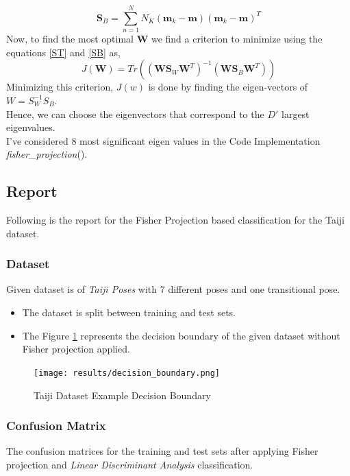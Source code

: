 \documentclass[12pt,twoside,a4paper]{article}
\begin{document}
\begin{equation} \label{SB}
    \textbf{S}_B = \sum_{n=1}^N N_K(\textbf{m}_k - \textbf{m})(\textbf{m}_k - \textbf{m})^T
\end{equation}
Now, to find the most optimal \textbf{W} we find a criterion to minimize using the equations \eqref{ST} and \eqref{SB} as,
\begin{equation}
    J(\textbf{W}) = Tr\left( (\textbf{W}\textbf{S}_W\textbf{W}^T)^{-1} (\textbf{W}\textbf{S}_B\textbf{W}^T) \right )
\end{equation}
Minimizing this criterion, $J(w)$ is done by finding the eigen-vectors of $W = S_W^{-1}S_B$. \\
Hence, we can choose the eigenvectors that correspond to the $D'$ largest eigenvalues. \\
I've considered 8 most significant eigen values in the Code Implementation \textit{fisher\_projection}().

\pagebreak
\subsection{Report}
Following is the report for the Fisher Projection based classification for the Taiji dataset.
\subsubsection{Dataset}
Given dataset is of \textit{Taiji Poses} with 7 different poses and one transitional pose.
\begin{itemize}
    \item The dataset is split between training and test sets.
    \item The Figure \ref{TAIJI} represents the decision boundary of the given dataset without Fisher projection applied.
\end{itemize}
\begin{figure}[H]
    \centering
    \texttt{[image: results/decision\_boundary.png]}
    \caption{Taiji Dataset Example Decision Boundary}
    \label{TAIJI}
\end{figure}
\pagebreak
\subsubsection{Confusion Matrix}
The confusion matrices for the training and test sets after applying Fisher projection and \textit{Linear Discriminant Analysis} classification.
\end{document}
